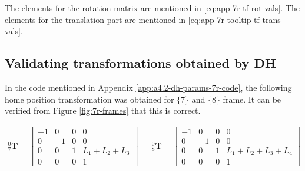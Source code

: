 The elements for the rotation matrix are mentioned in \ref{eq:app-7r-tf-rot-vals}. The elements for the translation part are mentioned in \ref{eq:app-7r-tooltip-tf-trans-vals}.

\subsection[A4.3: Validation]{Validating transformations obtained by DH}

In the code mentioned in Appendix \ref{app:a4.2-dh-params-7r-code}, the following home position transformation was obtained for $\{7\}$ and $\{8\}$ frame. It can be verified from Figure \ref{fig:7r-frames} that this is correct.

\begin{align}
    _{7}^{0}\mathbf{T} = \left[\begin{matrix}-1 & 0 & 0 & 0\\0 & -1 & 0 & 0\\0 & 0 & 1 & L_{1} + L_{2} + L_{3}\\0 & 0 & 0 & 1\end{matrix}\right]
    &&
    _{8}^{0}\mathbf{T} = \left[\begin{matrix}-1 & 0 & 0 & 0\\0 & -1 & 0 & 0\\0 & 0 & 1 & L_{1} + L_{2} + L_{3} + L_{4}\\0 & 0 & 0 & 1\end{matrix}\right]
\end{align}
